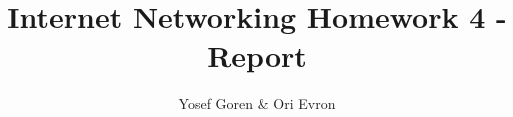 \documentclass{article}
\begin{document}
\author{Yosef Goren \& Ori Evron}
\title{Internet Networking Homework 4 - Report}
\maketitle
\tableofcontents
\end{document}
